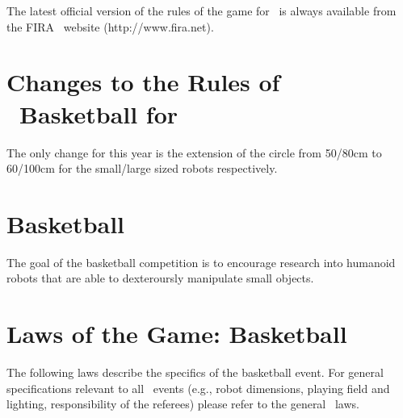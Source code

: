 \documentclass[12pt]{hurocup}
\begin{document}
The latest official version of the rules of the game for \HuroCup\ is
always available from the FIRA \HuroCup\ website (http://www.fira.net).

\section*{Changes to the Rules of \HuroCup\ Basketball for \thisyear}

The only change for this year is the extension of the circle from
50/80cm to 60/100cm for the small/large sized robots respectively.

\newpage

\section{Basketball}
\label{sec:basketball} 

The goal of the basketball competition is to encourage research into
humanoid robots that are able to dexteroursly manipulate small
objects.

\section{Laws of the Game: Basketball}
\label{sec:basketball-laws}

The following laws describe the specifics of the basketball
event. For general specifications relevant to all \HuroCup\ events
(e.g., robot dimensions, playing field and lighting, responsibility of
the referees) please refer to the general \HuroCup\ laws.

\label{bb-field}
\end{document}
